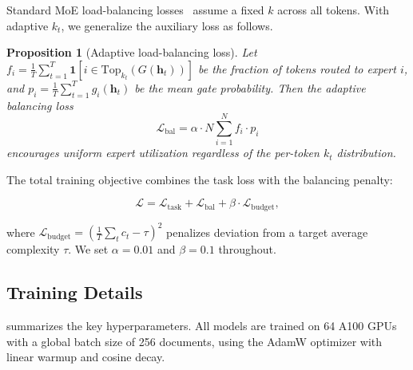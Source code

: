 \documentclass[11pt,a4paper]{article}
\newcommand{\loss}{\mathcal{L}}
\newtheorem{proposition}[theorem]{Proposition}
\begin{document}
Standard MoE load-balancing losses~\cite{fedus2022switch} assume a fixed $k$ across all tokens.
With adaptive $k_t$, we generalize the auxiliary loss as follows.

\begin{proposition}[Adaptive load-balancing loss]
\label{prop:balance}
Let $f_i = \frac{1}{T}\sum_{t=1}^T \mathbf{1}[i \in \text{Top}_{k_t}(G(\mathbf{h}_t))]$
be the fraction of tokens routed to expert $i$, and
$p_i = \frac{1}{T}\sum_{t=1}^T g_i(\mathbf{h}_t)$ be the mean gate probability.
Then the adaptive balancing loss
\begin{equation}
\label{eq:balance}
  \loss_{\text{bal}} = \alpha \cdot N \sum_{i=1}^N f_i \cdot p_i
\end{equation}
encourages uniform expert utilization regardless of the per-token $k_t$ distribution.
\end{proposition}

The total training objective combines the task loss with the balancing penalty:

\begin{equation}
\label{eq:total_loss}
  \loss = \loss_{\text{task}} + \loss_{\text{bal}} + \beta \cdot \loss_{\text{budget}},
\end{equation}

\noindent where $\loss_{\text{budget}} = \left(\frac{1}{T}\sum_t c_t - \tau\right)^2$
penalizes deviation from a target average complexity $\tau$.
We set $\alpha = 0.01$ and $\beta = 0.1$ throughout.

\subsection{Training Details}

 summarizes the key hyperparameters.
All models are trained on 64 A100 GPUs with a global batch size of 256 documents, using
the AdamW optimizer with linear warmup and cosine decay.
\end{document}
